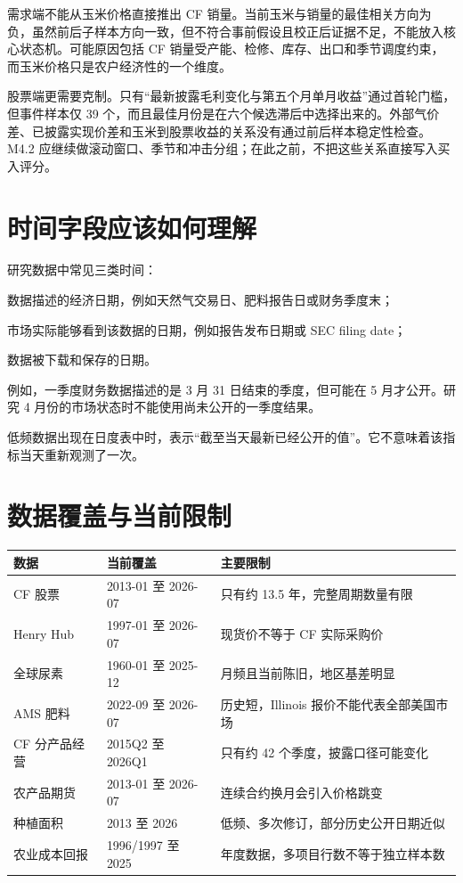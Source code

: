 \documentclass[11pt,a4paper]{ctexart}
\begin{document}
需求端不能从玉米价格直接推出 CF 销量。当前玉米与销量的最佳相关方向为负，虽然前后子样本方向一致，但不符合事前假设且校正后证据不足，不能放入核心状态机。可能原因包括 CF 销量受产能、检修、库存、出口和季节调度约束，而玉米价格只是农户经济性的一个维度。

股票端更需要克制。只有“最新披露毛利变化与第五个月单月收益”通过首轮门槛，但事件样本仅 39 个，而且最佳月份是在六个候选滞后中选择出来的。外部气价差、已披露实现价差和玉米到股票收益的关系没有通过前后样本稳定性检查。M4.2 应继续做滚动窗口、季节和冲击分组；在此之前，不把这些关系直接写入买入评分。

\section{时间字段应该如何理解}

研究数据中常见三类时间：

\begin{description}[style=nextline]
  \item[观察日期] 数据描述的经济日期，例如天然气交易日、肥料报告日或财务季度末；
  \item[公开日期] 市场实际能够看到该数据的日期，例如报告发布日期或 SEC filing date；
  \item[本地获取日期] 数据被下载和保存的日期。
\end{description}

例如，一季度财务数据描述的是 3 月 31 日结束的季度，但可能在 5 月才公开。研究 4 月份的市场状态时不能使用尚未公开的一季度结果。

低频数据出现在日度表中时，表示“截至当天最新已经公开的值”。它不意味着该指标当天重新观测了一次。

\section{数据覆盖与当前限制}

\begin{center}
\small
\begin{tabularx}{\textwidth}{L{3.1cm}L{3.2cm}Y}
\toprule
数据 & 当前覆盖 & 主要限制 \\
\midrule
CF 股票 & 2013-01 至 2026-07 & 只有约 13.5 年，完整周期数量有限 \\
Henry Hub & 1997-01 至 2026-07 & 现货价不等于 CF 实际采购价 \\
全球尿素 & 1960-01 至 2025-12 & 月频且当前陈旧，地区基差明显 \\
AMS 肥料 & 2022-09 至 2026-07 & 历史短，Illinois 报价不能代表全部美国市场 \\
CF 分产品经营 & 2015Q2 至 2026Q1 & 只有约 42 个季度，披露口径可能变化 \\
农产品期货 & 2013-01 至 2026-07 & 连续合约换月会引入价格跳变 \\
种植面积 & 2013 至 2026 & 低频、多次修订，部分历史公开日期近似 \\
农业成本回报 & 1996/1997 至 2025 & 年度数据，多项目行数不等于独立样本数 \\
\bottomrule
\end{tabularx}
\normalsize
\end{center}
\end{document}
